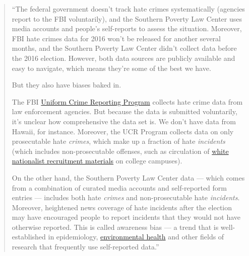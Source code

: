\documentclass[
  letterpaper,
  DIV=11,
  numbers=noendperiod]{scrartcl}
\begin{document}
\begin{quote}
``The federal government doesn't track hate crimes systematically
(agencies report to the FBI voluntarily), and the Southern Poverty Law
Center uses media accounts and people's self-reports to assess the
situation. Moreover, FBI hate crimes data for 2016 won't be released for
another several months, and the Southern Poverty Law Center didn't
collect data before the 2016 election. However, both data sources are
publicly available and easy to navigate, which means they're some of the
best we have.

But they also have biases baked in.

The FBI \href{https://ucr.fbi.gov/}{Uniform Crime Reporting Program}
collects hate crime data from law enforcement agencies. But because the
data is submitted voluntarily, it's unclear how comprehensive the data
set is. We don't have data from Hawaii, for instance. Moreover, the UCR
Program collects data on only prosecutable hate \emph{crimes}, which
make up a fraction of hate \emph{incidents} (which includes
non-prosecutable offenses, such as circulation of
\href{http://www.scpr.org/news/2016/11/16/66172/ucla-quickly-removes-white-nationalist-fliers-from/}{white
nationalist recruitment materials} on college campuses).

On the other hand, the Southern Poverty Law Center data --- which comes
from a combination of curated media accounts and self-reported form
entries --- includes both hate \emph{crimes} and non-prosecutable hate
\emph{incidents}. Moreover, heightened news coverage of hate incidents
after the election may have encouraged people to report incidents that
they would not have otherwise reported. This is called awareness bias
--- a trend that is well-established in epidemiology,
\href{http://journals.lww.com/epidem/Abstract/2000/03000/An_Exploration_of_Awareness_Bias_in_Two.20.aspx}{environmental
health} and other fields of research that frequently use self-reported
data.''
\end{quote}
\end{document}
